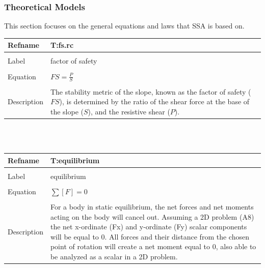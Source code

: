 \documentclass[12pt]{article}
\begin{document}
\subsubsection{Theoretical Models}
\label{Sec:TheoMode}
This section focuses on the general equations and laws that SSA is based on.
~\newline
\noindent \begin{minipage}{\textwidth}
\begin{tabular}{p{} p{}}
\toprule \textbf{Refname} & \textbf{T:fs.rc}
\label{T:fs.rc}
\\ \midrule \\
Label & factor of safety
\\ \midrule \\
Equation & $FS=\frac{P}{S}$
\\ \midrule \\
Description & The stability metric of the slope, known as the factor of safety ($FS$), is determined by the ratio of the shear force at the base of the slope ($S$), and the resistive shear ($P$).
\\ \bottomrule \end{tabular}
\end{minipage}\\
~\newline
\noindent \begin{minipage}{\textwidth}
\begin{tabular}{p{} p{}}
\toprule \textbf{Refname} & \textbf{T:equilibrium}
\label{T:equilibrium}
\\ \midrule \\
Label & equilibrium
\\ \midrule \\
Equation & $\displaystyle\sum{\left[F\right]}=0$
\\ \midrule \\
Description & For a body in static equilibrium, the net forces and net moments acting on the body will cancel out. Assuming a 2D problem (A8) the net x-ordinate (Fx) and y-ordinate (Fy) scalar components will be equal to 0. All forces and their distance from the chosen point of rotation will create a net moment equal to 0, also able to be analyzed as a scalar in a 2D problem.
\\ \bottomrule \end{tabular}
\end{minipage}\\
~\newline
\end{document}
